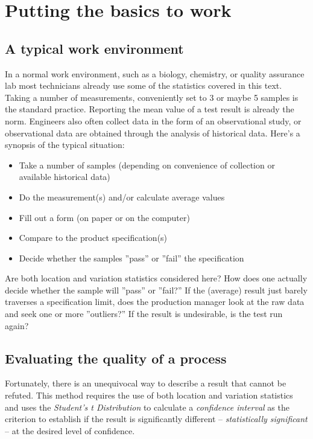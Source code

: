 \chapter{Putting the basics to work}

\section{A typical work environment}
In a normal work environment, such as a biology, chemistry, or quality assurance lab most technicians already use some of the statistics covered in this text.  Taking a number of measurements, conveniently set to 3 or maybe 5 samples is the standard practice.  Reporting the mean value of a test result is already the norm.  Engineers also often collect data in the form of an observational study, or observational data are obtained through the analysis of historical data.
Here's a synopsis of the typical situation:
\begin{center}
  \begin{itemize}
  \item Take a number of samples (depending on convenience of collection or available historical data)
  \item Do the measurement(s) and/or calculate average values
  \item Fill out a form (on paper or on the computer)
  \item Compare to the product specification(s)
  \item Decide whether the samples ''pass'' or ''fail'' the specification
  \end{itemize}
\end{center}  
  
Are both location and variation statistics considered here?  How does one actually decide whether the sample will ''pass'' or ''fail?''  If the (average) result just barely traverses a specification limit, does the production manager look at the raw data and seek one or more ''outliers?''  If the result is undesirable, is the test run again?
  
\section{Evaluating the quality of a process}
Fortunately, there is an unequivocal way to describe a result that cannot be refuted.  This method requires the use of both location and variation statistics and uses the \textit{Student's t Distribution} to calculate a \textit{confidence interval} as the criterion to establish if the result is significantly different -- \textit{statistically significant} -- at the desired level of confidence.

